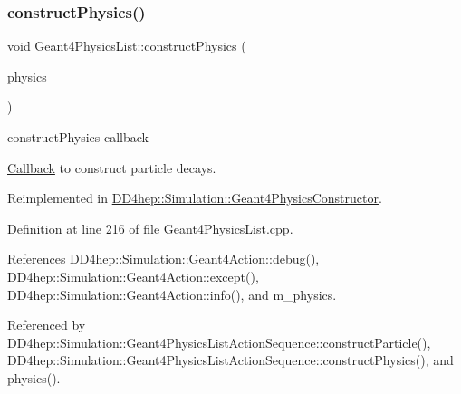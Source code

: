 \hypertarget{class_d_d4hep_1_1_simulation_1_1_geant4_physics_list_ac930c930b12719772ec5119cdec72ef1}{}\label{class_d_d4hep_1_1_simulation_1_1_geant4_physics_list_ac930c930b12719772ec5119cdec72ef1} 
\subsubsection{\texorpdfstring{construct\+Physics()}{constructPhysics()}}
{\footnotesize\ttfamily void Geant4\+Physics\+List\+::construct\+Physics (\begin{DoxyParamCaption}\item[{G4\+V\+Modular\+Physics\+List $\ast$}]{physics }\end{DoxyParamCaption})\hspace{0.3cm}{\ttfamily [virtual]}}



construct\+Physics callback 

\hyperlink{class_d_d4hep_1_1_callback}{Callback} to construct particle decays. 

Reimplemented in \hyperlink{class_d_d4hep_1_1_simulation_1_1_geant4_physics_constructor_a97b80e1316943ae5805d8d006fa4f1b5}{D\+D4hep\+::\+Simulation\+::\+Geant4\+Physics\+Constructor}.



Definition at line 216 of file Geant4\+Physics\+List.\+cpp.



References D\+D4hep\+::\+Simulation\+::\+Geant4\+Action\+::debug(), D\+D4hep\+::\+Simulation\+::\+Geant4\+Action\+::except(), D\+D4hep\+::\+Simulation\+::\+Geant4\+Action\+::info(), and m\+\_\+physics.



Referenced by D\+D4hep\+::\+Simulation\+::\+Geant4\+Physics\+List\+Action\+Sequence\+::construct\+Particle(), D\+D4hep\+::\+Simulation\+::\+Geant4\+Physics\+List\+Action\+Sequence\+::construct\+Physics(), and physics().

\hypertarget{class_d_d4hep_1_1_simulation_1_1_geant4_physics_list_ae769a12f86a3cb785c1e040c5a32d8fb}{}\label{class_d_d4hep_1_1_simulation_1_1_geant4_physics_list_ae769a12f86a3cb785c1e040c5a32d8fb} 
